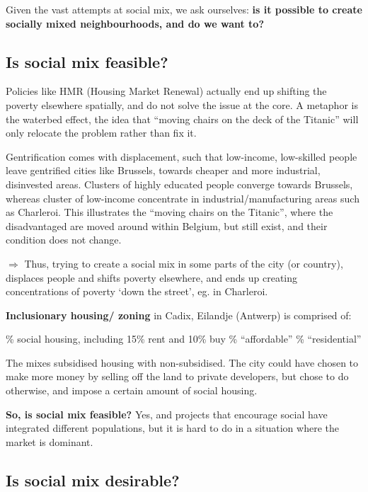 \documentclass{article}
\begin{document}
Given the vast attempts at social mix, we ask ourselves: \textbf{is it possible to create socially mixed neighbourhoods, and do we want to?}

\subsection{Is social mix feasible?}

Policies like HMR (Housing Market Renewal) actually end up shifting the poverty elsewhere spatially, and do not solve the issue at the core. A metaphor is the waterbed effect, the idea that ``moving chairs on the deck of the Titanic'' will only relocate the problem rather than fix it.

Gentrification comes with displacement, such that low-income, low-skilled people leave gentrified cities like Brussels, towards cheaper and more industrial, disinvested areas. Clusters of highly educated people converge towards Brussels, whereas cluster of low-income  concentrate in industrial/manufacturing areas such as Charleroi.
This illustrates the ``moving chairs on the Titanic'', where the disadvantaged are moved around within Belgium, but still exist, and their condition does not change. 

$\Rightarrow$ Thus, trying to create a social mix in some parts of the city (or country), displaces people and shifts poverty elsewhere, and ends up creating concentrations of poverty `down the street', eg. in Charleroi.

\textbf{Inclusionary housing/ zoning} in Cadix, Eilandje (Antwerp) is comprised of:
\begin{outline}
	\% social housing, including 15\% rent and 10\% buy
	\% ``affordable''
	\% ``residential''
\end{outline}

The mixes subsidised housing with non-subsidised. The city could have chosen to make more money by selling off the land to private developers, but chose to do otherwise, and impose a certain amount of social housing.

\textbf{So, is social mix feasible?} Yes, and projects that encourage social have integrated different populations, but it is hard to do in a situation where the market is dominant.

\subsection{Is social mix desirable?}
\end{document}
